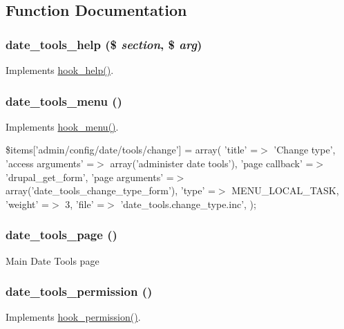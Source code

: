 \subsection{Function Documentation}
\hypertarget{date__tools_8module_a3a987dd4bcf123ce3578e7510566f026}{
\subsubsection[{date\_\-tools\_\-help}]{\setlength{\rightskip}{0pt plus 5cm}date\_\-tools\_\-help (\$ {\em section}, \/  \$ {\em arg})}}
\label{date__tools_8module_a3a987dd4bcf123ce3578e7510566f026}
Implements \hyperlink{group__hooks_ga5589c2714a782738e8851c4c90231f0e}{hook\_\-help()}. \hypertarget{date__tools_8module_aedbe49d3794ad882e2cd8482ee7498b1}{
\subsubsection[{date\_\-tools\_\-menu}]{\setlength{\rightskip}{0pt plus 5cm}date\_\-tools\_\-menu ()}}
\label{date__tools_8module_aedbe49d3794ad882e2cd8482ee7498b1}
Implements \hyperlink{group__hooks_ga5c95244fea59b25666e409759e133ded}{hook\_\-menu()}. 

\$items\mbox{[}'admin/config/date/tools/change'\mbox{]} = array( 'title' =$>$ 'Change type', 'access arguments' =$>$ array('administer date tools'), 'page callback' =$>$ 'drupal\_\-get\_\-form', 'page arguments' =$>$ array('date\_\-tools\_\-change\_\-type\_\-form'), 'type' =$>$ MENU\_\-LOCAL\_\-TASK, 'weight' =$>$ 3, 'file' =$>$ 'date\_\-tools.change\_\-type.inc', );\hypertarget{date__tools_8module_a5207aac2d00ede5fa29257410b3fb68d}{
\subsubsection[{date\_\-tools\_\-page}]{\setlength{\rightskip}{0pt plus 5cm}date\_\-tools\_\-page ()}}
\label{date__tools_8module_a5207aac2d00ede5fa29257410b3fb68d}
Main Date Tools page \hypertarget{date__tools_8module_ac007e8a645addfc1c9b043f085b4cf02}{
\subsubsection[{date\_\-tools\_\-permission}]{\setlength{\rightskip}{0pt plus 5cm}date\_\-tools\_\-permission ()}}
\label{date__tools_8module_ac007e8a645addfc1c9b043f085b4cf02}
Implements \hyperlink{group__hooks_ga2b22b45f4925f2478412477bae329713}{hook\_\-permission()}. 